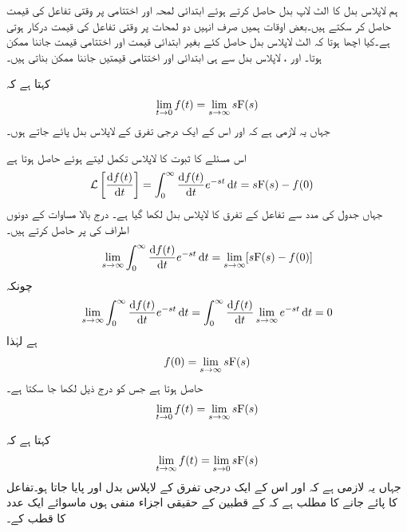 ہم لاپلاس بدل  کا الٹ لاپ بدل  حاصل کرتے ہوئے ابتدائی لمحہ  اور اختتامی  پر وقتی تفاعل کی قیمت حاصل کر سکتے ہیں۔بعض اوقات ہمیں صرف انہیں دو لمحات پر وقتی تفاعل کی قیمت درکار ہوتی ہے۔کیا اچھا ہوتا کہ الٹ لاپلاس بدل حاصل کئے بغیر ابتدائی قیمت اور اختتامی قیمت جاننا ممکن ہوتا۔ اور ، لاپلاس بدل سے ہی ابتدائی اور اختتامی قیمتیں جاننا ممکن بناتی ہیں۔

 کہتا ہے  کہ
\begin{align}
\lim_{t \to 0} f(t)=\lim_{s \to \infty} s{{\textup{F}}}(s)
\end{align}
جہاں یہ لازمی ہے کہ   اور اس کے ایک درجی تفرق  کے لاپلاس بدل پائے جاتے ہوں۔

اس مسئلے کا ثبوت  کا لاپلاس تکمل لیتے ہوئے حاصل ہوتا ہے
\begin{align*}
\Laplace\left[\frac{\dif f(t)}{\dif t}\right]&=\int_0^{\infty} \frac{\dif f(t)}{\dif t} e^{-st} \dif t=s\bF(s)-f(0)
\end{align*}
جہاں جدول  کی مدد سے تفاعل کے تفرق کا لاپلاس بدل لکھا گیا ہے۔ درج بالا مساوات کے دونوں اطراف کی   پر حاصل کرتے ہیں۔
\begin{align*}
\lim_{s \to \infty}\int_0^{\infty} \frac{\dif f(t)}{\dif t} e^{-st} \dif t=\lim_{s \to \infty}[s\bF(s)-f(0)]
\end{align*}
چونکہ
\begin{align*}
\lim_{s \to \infty}\int_0^{\infty} \frac{\dif f(t)}{\dif t} e^{-st} \dif t=\int_0^{\infty} \frac{\dif f(t)}{\dif t} \lim_{s \to \infty} e^{-st} \dif t=0
\end{align*}
ہے لہٰذا
\begin{align*}
f(0)=\lim_{s \to \infty}s{{\textup{F}}}(s)
\end{align*}
حاصل ہوتا ہے جس کو درج ذیل لکھا جا سکتا ہے۔
\begin{align*}
\lim_{t \to 0}f(t)=\lim_{s \to \infty}s{{\textup{F}}}(s)
\end{align*}
   
 کہتا ہے  کہ
\begin{align}
\lim_{t \to \infty} f(t)=\lim_{s \to 0} s{{\textup{F}}}(s)
\end{align}
جہاں یہ لازمی ہے کہ   اور اس کے ایک درجی تفرق  کے لاپلاس بدل اور  پایا جاتا ہو۔تفاعل کا  پائے جانے کا مطلب ہے کہ  کے قطبین کے حقیقی اجزاء منفی ہوں ماسوائے ایک عدد  کا قطب کے۔


